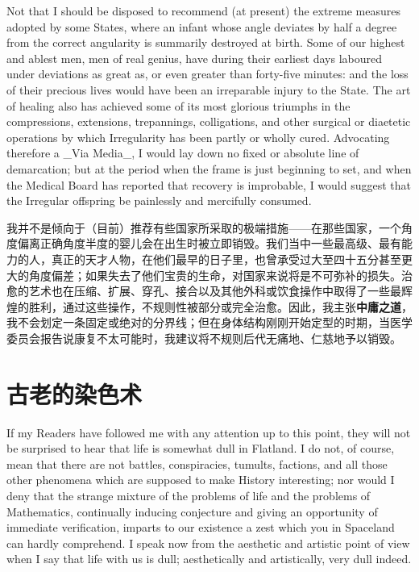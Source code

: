 \documentclass[12pt,UTF8]{ctexbook}
\begin{document}
Not that I should be disposed to recommend (at present) the extreme measures adopted by some States, where an infant whose angle deviates by half a degree from the correct angularity is summarily destroyed at birth. Some of our highest and ablest men, men of real genius, have during their earliest days laboured under deviations as great as, or even greater than forty-five minutes: and the loss of their precious lives would have been an irreparable injury to the State. The art of healing also has achieved some of its most glorious triumphs in the compressions, extensions, trepannings, colligations, and other surgical or diaetetic operations by which Irregularity has been partly or wholly cured. Advocating therefore a \_Via Media\_, I would lay down no fixed or absolute line of demarcation; but at the period when the frame is just beginning to set, and when the Medical Board has reported that recovery is improbable, I would suggest that the Irregular offspring be painlessly and mercifully consumed.

我并不是倾向于（目前）推荐有些国家所采取的极端措施——在那些国家，一个角度偏离正确角度半度的婴儿会在出生时被立即销毁。我们当中一些最高级、最有能力的人，真正的天才人物，在他们最早的日子里，也曾承受过大至四十五分甚至更大的角度偏差；如果失去了他们宝贵的生命，对国家来说将是不可弥补的损失。治愈的艺术也在压缩、扩展、穿孔、接合以及其他外科或饮食操作中取得了一些最辉煌的胜利，通过这些操作，不规则性被部分或完全治愈。因此，我主张\textbf{中庸之道}，我不会划定一条固定或绝对的分界线；但在身体结构刚刚开始定型的时期，当医学委员会报告说康复不太可能时，我建议将不规则后代无痛地、仁慈地予以销毁。

\chapter{古老的染色术}

If my Readers have followed me with any attention up to this point, they will not be surprised to hear that life is somewhat dull in Flatland. I do not, of course, mean that there are not battles, conspiracies, tumults, factions, and all those other phenomena which are supposed to make History interesting; nor would I deny that the strange mixture of the problems of life and the problems of Mathematics, continually inducing conjecture and giving an opportunity of immediate verification, imparts to our existence a zest which you in Spaceland can hardly comprehend. I speak now from the aesthetic and artistic point of view when I say that life with us is dull; aesthetically and artistically, very dull indeed.
\end{document}
